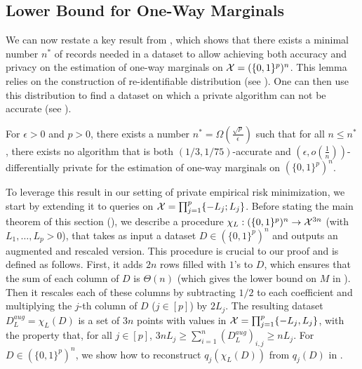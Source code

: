 \subsection{Lower Bound for One-Way Marginals}
\label{sec:lower-bounds-1-1}


We can now restate a key result from \citet{bun2014Fingerprinting}, which shows
that there exists a minimal number $n^*$ of records needed in a dataset to allow
achieving both accuracy and privacy on the estimation of one-way marginals on
$\mathcal X=(\{0, 1\}^p)^n$.
This lemma relies on the construction of re-identifiable distribution
(see \citealt[Definition~2.10]{bun2014Fingerprinting}). One can then use this
distribution to find a dataset on which a private algorithm can not be accurate
(see \citealt[Lemma~2.11]{bun2014Fingerprinting}).
\begin{lemma}
  \label{lemma:bun-fingerprint-1way-marginal}
  For $\epsilon > 0$ and $p > 0$, there exists a number $n^* = \Omega(\frac{\sqrt{p}}{\epsilon})$
  such that for all $n \le n^*$, there exists no algorithm that is both
  $(1/3, 1/75)$-accurate and $(\epsilon, o\left(\frac{1}{n}\right))$-differentially
  private for the estimation of one-way marginals on $(\{0, 1\}^p)^n$.
\end{lemma}

To leverage this result in our setting of private empirical risk minimization,
we start by extending it to queries on $\mathcal X = \prod_{j=1}^p \{-L_j; L_j\}$.
Before stating the main theorem of this section (),
we describe a procedure $\chi_L : (\{0, 1\}^p)^n \rightarrow \mathcal X^{3n}$
(with $L_1, \dots, L_p > 0$), that takes as input a dataset $D \in (\{0,
  1\}^p)^n$ and outputs an augmented and rescaled version. This procedure
is crucial to our proof and is defined as follows.
First, it adds $2n$ rows filled with $1$'s to $D$, which ensures that the sum
of each column of $D$ is $\Theta(n)$ (which gives the lower bound on $M$ in
).
Then it rescales each of these columns by subtracting $1/2$ to each coefficient
and multiplying the $j$-th column of $D$ ($j \in [p]$) by $2L_j$.
The resulting dataset $D_L^{aug} = \chi_L(D)$ is a set of $3n$ points with values
in $\mathcal X = \prod_{j=1}^p \{-L_j, L_j\}$, with the property that, for all
$j \in [p]$, $3nL_j \ge \sum_{i=1}^n (D_L^{aug})_{i,j} \ge nL_j$.
For $D \in (\{0, 1\}^p)^n$, we show how to reconstruct $q_j(\chi_L(D))$
from $q_j(D)$
in .

